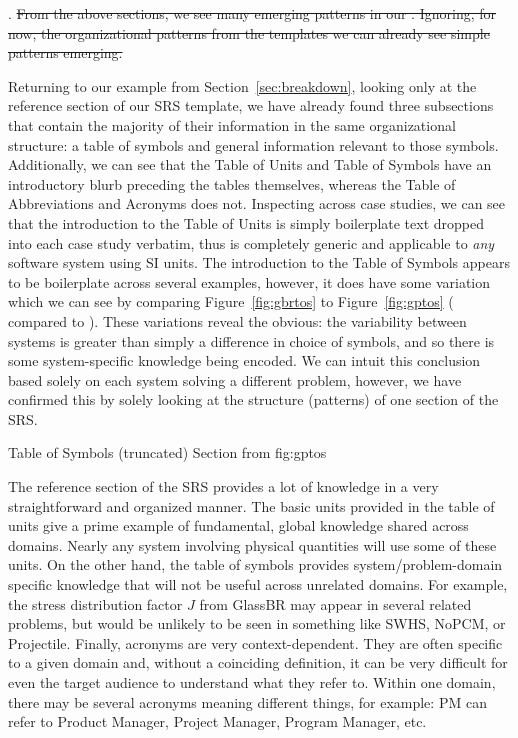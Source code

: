 . \sout{From the above sections, we see many emerging 
patterns 
in our \sfs{}. Ignoring, 
for now, the organizational patterns from the \smithea{} templates we can 
already see simple patterns emerging.}

Returning to our example from Section~\ref{sec:breakdown}, looking only at the 
reference section of our SRS template, we have already found
three subsections that contain the majority of their information in the same
organizational structure: a table of symbols and general information relevant 
to those symbols. Additionally, we can see that the Table of Units and Table of 
Symbols have an introductory blurb preceding the tables themselves, whereas the 
Table of Abbreviations and Acronyms does not. Inspecting across case studies, 
we can see that the introduction to the Table of Units is simply boilerplate 
text dropped into each case study verbatim, thus is completely generic and 
applicable to \emph{any} software system using SI units. The introduction to 
the Table of Symbols appears to be boilerplate across several examples, 
however, it does have some variation which we can see by comparing 
Figure~\ref{fig:gbrtos} to Figure~\ref{fig:gptos} (\gb{} compared to \gp{}).
These variations reveal the obvious: the variability between systems is greater 
than simply a difference in choice of symbols, and so there is some 
system-specific knowledge being encoded. We can intuit this conclusion based 
solely on each system solving a different problem, however, we have confirmed 
this by solely looking at the structure (patterns) of one section of the SRS.

{Table of Symbols (truncated) Section from \gp{}}
{fig:gptos}

The reference section of the SRS provides a lot of knowledge in a very 
straightforward and organized manner. The basic units provided in the table of 
units give a prime example of fundamental, global knowledge shared across 
domains. Nearly any system involving physical quantities will use some of these 
units. On the other hand, the table of symbols provides system/problem-domain 
specific knowledge that will not be useful across unrelated domains. For 
example, the stress distribution factor $J$ from GlassBR may appear in several 
related problems, but would be unlikely to be seen in something like SWHS, 
NoPCM, or Projectile. Finally, acronyms are very context-dependent. They are 
often specific to a given domain and, without a coinciding definition, it can 
be very difficult for even the target audience to understand what they refer 
to. Within one domain, there may be several acronyms meaning different things, 
for example: PM can refer to Product Manager, Project Manager, Program 
Manager, etc.

